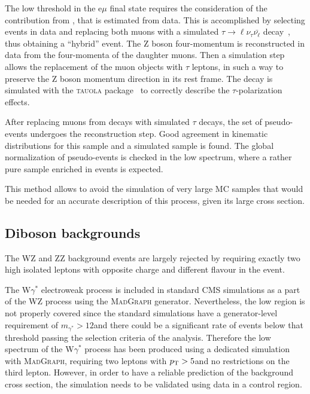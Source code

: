 The low \MET threshold in the e$\mu$ final state requires the consideration of the contribution from \dytt, that is estimated from data.
This is accomplished by selecting \dymm events in data and replacing both muons with a simulated
$\tau\to \ell\nu_\tau\bar{\nu_\ell}$ decay~\cite{Chatrchyan:2013iaa}, thus obtaining a ``hybrid'' event. The Z boson four-momentum is reconstructed in data from the four-momenta of the daughter muons. Then a simulation step allows the replacement of the muon objects with $\tau$ leptons, in such a way to preserve the Z boson momentum direction in its rest frame. The \dytt decay is simulated with the \textsc{tauola} package~\cite{Jadach:1990mz} to correctly describe the $\tau$-polarization effects.

After replacing muons from \dymm decays with simulated $\tau$ decays, the set of pseudo-\dytt events undergoes the reconstruction step. Good agreement in kinematic distributions for this sample
and a simulated \dytt sample is found. The global normalization of pseudo-\dytt events is checked in the low \mt spectrum, where a rather pure sample enriched in \dytt events is expected.

This method allows to avoid the simulation of very large MC samples that would be needed for an accurate description of this process, given its large cross section. 





\subsection{Diboson backgrounds\label{sec:diboson}}

The WZ and ZZ background events are largely rejected by requiring exactly two high \pt isolated leptons with opposite charge and different flavour in the event. 

The W$\gamma^*$ electroweak process is included in standard CMS simulations as a part of the WZ
process using the \textsc{MadGraph} generator. Nevertheless, the low \mll region is not properly covered since the standard simulations have a generator-level requirement of $m_{\gamma^*}>12$\GeV and there could be a significant rate of events below that threshold passing the selection criteria of the analysis. Therefore the low \mll spectrum of the W$\gamma^*$ process has been produced using a dedicated simulation with \textsc{MadGraph}, requiring two leptons with $p_\mathrm{T} > 5$\GeV and no restrictions on the third lepton. However, in order to have a reliable prediction of the background cross section, the simulation needs to be validated using data in a control region.

